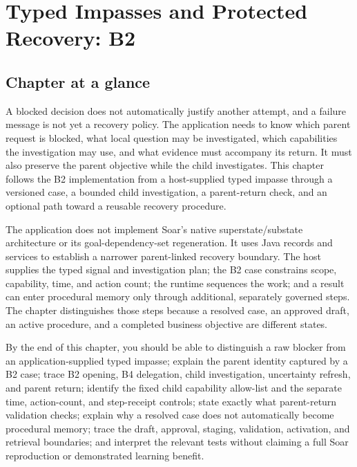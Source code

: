 \chapter{Typed Impasses and Protected Recovery: B2}
\label{ch:typed-impasses-protected-recovery}

\section*{Chapter at a glance}
{}

A blocked decision does not automatically justify another attempt, and a failure message is not yet a recovery policy. The application needs to know which parent request is blocked, what local question may be investigated, which capabilities the investigation may use, and what evidence must accompany its return. It must also preserve the parent objective while the child investigates. This chapter follows the B2 implementation from a host-supplied typed impasse through a versioned case, a bounded child investigation, a parent-return check, and an optional path toward a reusable recovery procedure.

The application does not implement Soar's native superstate/substate architecture or its goal-dependency-set regeneration. It uses Java records and services to establish a narrower parent-linked recovery boundary. The host supplies the typed signal and investigation plan; the B2 case constrains scope, capability, time, and action count; the runtime sequences the work; and a result can enter procedural memory only through additional, separately governed steps. The chapter distinguishes those steps because a resolved case, an approved draft, an active procedure, and a completed business objective are different states.

\begin{learningbox}
By the end of this chapter, you should be able to distinguish a raw blocker from an application-supplied typed impasse; explain the parent identity captured by a B2 case; trace B2 opening, B4 delegation, child investigation, uncertainty refresh, and parent return; identify the fixed child capability allow-list and the separate time, action-count, and step-receipt controls; state exactly what parent-return validation checks; explain why a resolved case does not automatically become procedural memory; trace the draft, approval, staging, validation, activation, and retrieval boundaries; and interpret the relevant tests without claiming a full Soar reproduction or demonstrated learning benefit.
\end{learningbox}

